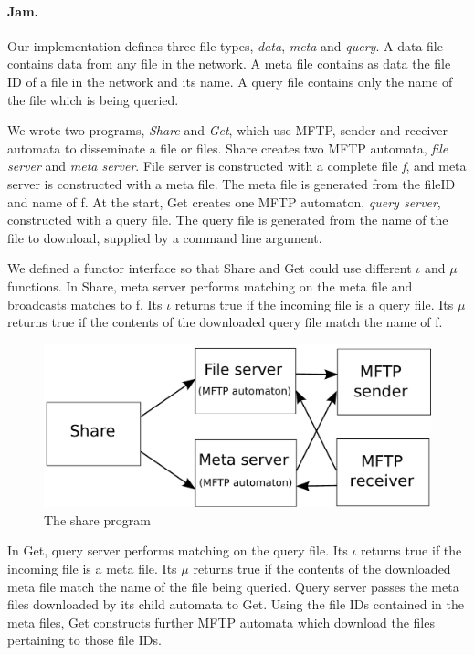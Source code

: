 \documentclass[letterpaper]{article}
\begin{document}
\paragraph{Jam.} %
Our implementation defines three file types, \emph{data}, \emph{meta} and \emph{query}.  
A data file contains data from any file in the network.
A meta file contains as data the file ID of a file in the network and its name. 
A query file contains only the name of the file which is being queried.

We wrote two programs, \emph{Share} and \emph{Get}, which use MFTP, sender and receiver automata to disseminate a file or files. %
Share creates two MFTP automata, \emph{file server} and \emph{meta server}.
File server is constructed with a complete file \emph{f}, and meta server is constructed with a meta file.
The meta file is generated from the fileID and name of f.
At the start, Get creates one MFTP automaton, \emph{query server}, constructed with a query file.
The query file is generated from the name of the file to download, supplied by a command line argument.

We defined a functor interface so that Share and Get could use different $\iota$ and $\mu$ functions.
In Share, meta server performs matching on the meta file and broadcasts matches to f.
Its $\iota$ returns true if the incoming file is a query file.
Its $\mu$ returns true if the contents of the downloaded query file match the name of f.

\begin{figure}
  \center
  \includegraphics[scale=0.65]{share_diagram}
  \caption{The share program \label{EvaluationOne}}
\end{figure}

In Get, query server performs matching on the query file.
Its $\iota$ returns true if the incoming file is a meta file.
Its $\mu$ returns true if the contents of the downloaded meta file match the name of the file being queried.
Query server passes the meta files downloaded by its child automata to Get.
Using the file IDs contained in the meta files, Get constructs further MFTP automata which download the files pertaining to those file IDs.
\end{document}
